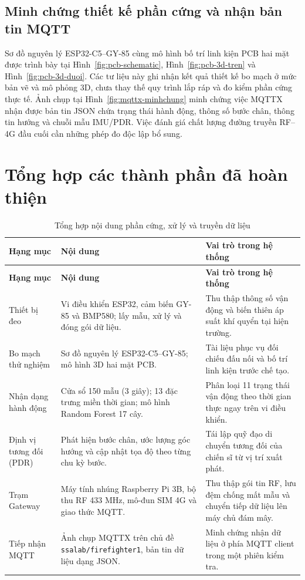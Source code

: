 \subsection{Minh chứng thiết kế phần cứng và nhận bản tin MQTT}
Sơ đồ nguyên lý ESP32-C5--GY-85 cùng mô hình bố trí linh kiện PCB hai mặt được trình bày tại Hình~\ref{fig:pcb-schematic}, Hình~\ref{fig:pcb-3d-tren} và Hình~\ref{fig:pcb-3d-duoi}. Các tư liệu này ghi nhận kết quả thiết kế bo mạch ở mức bản vẽ và mô phỏng 3D, chưa thay thế quy trình lắp ráp và đo kiểm phần cứng thực tế. Ảnh chụp tại Hình~\ref{fig:mqttx-minhchung} minh chứng việc MQTTX nhận được bản tin JSON chứa trạng thái hành động, thông số bước chân, thông tin hướng và chuỗi mẫu IMU/PDR. Việc đánh giá chất lượng đường truyền RF--4G đầu cuối cần những phép đo độc lập bổ sung.

\section{Tổng hợp các thành phần đã hoàn thiện}
\begingroup\SmallTable
\begin{longtable}{|P{106bp}|P{147bp}|P{155bp}|}
\caption{Tổng hợp nội dung phần cứng, xử lý và truyền dữ liệu}\label{tab:completion}\\\hline
\textbf{Hạng mục}&\textbf{Nội dung}&\textbf{Vai trò trong hệ thống}\\\hline\endfirsthead
\hline\textbf{Hạng mục}&\textbf{Nội dung}&\textbf{Vai trò trong hệ thống}\\\hline\endhead
Thiết bị đeo&Vi điều khiển ESP32, cảm biến GY-85 và BMP580; lấy mẫu, xử lý và đóng gói dữ liệu.&Thu thập thông số vận động và biến thiên áp suất khí quyển tại hiện trường.\\\hline
Bo mạch thử nghiệm&Sơ đồ nguyên lý ESP32-C5--GY-85; mô hình 3D hai mặt PCB.&Tài liệu phục vụ đối chiếu đấu nối và bố trí linh kiện trước chế tạo.\\\hline
Nhận dạng hành động&Cửa sổ 150 mẫu (3 giây); 13 đặc trưng miền thời gian; mô hình Random Forest 17 cây.&Phân loại 11 trạng thái vận động theo thời gian thực ngay trên vi điều khiển.\\\hline
Định vị tương đối (PDR)&Phát hiện bước chân, ước lượng góc hướng và cập nhật tọa độ theo từng chu kỳ bước.&Tái lập quỹ đạo di chuyển tương đối của chiến sĩ từ vị trí xuất phát.\\\hline
Trạm Gateway&Máy tính nhúng Raspberry Pi 3B, bộ thu RF 433 MHz, mô-đun SIM 4G và giao thức MQTT.&Thu thập gói tin RF, lưu đệm chống mất mẫu và chuyển tiếp dữ liệu lên máy chủ đám mây.\\\hline
Tiếp nhận MQTT&Ảnh chụp MQTTX trên chủ đề \nolinkurl{ssalab/firefighter1}, bản tin dữ liệu dạng JSON.&Minh chứng nhận dữ liệu ở phía MQTT client trong một phiên kiểm tra.\\\hline
\end{longtable}\endgroup

